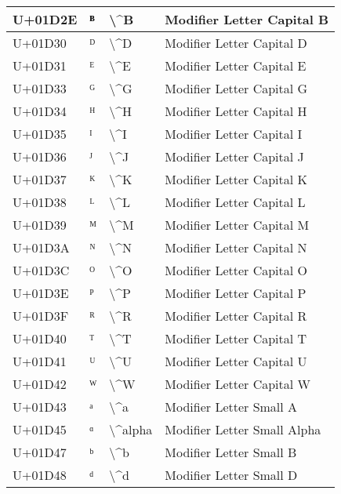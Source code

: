 \begin{table}[h]
\begin{tabulary}{\linewidth}{|L|L|L|L|}
U+01D2E & ᴮ & {\textbackslash}{\textasciicircum}B & Modifier Letter Capital B \\
\hline
U+01D30 & ᴰ & {\textbackslash}{\textasciicircum}D & Modifier Letter Capital D \\
\hline
U+01D31 & ᴱ & {\textbackslash}{\textasciicircum}E & Modifier Letter Capital E \\
\hline
U+01D33 & ᴳ & {\textbackslash}{\textasciicircum}G & Modifier Letter Capital G \\
\hline
U+01D34 & ᴴ & {\textbackslash}{\textasciicircum}H & Modifier Letter Capital H \\
\hline
U+01D35 & ᴵ & {\textbackslash}{\textasciicircum}I & Modifier Letter Capital I \\
\hline
U+01D36 & ᴶ & {\textbackslash}{\textasciicircum}J & Modifier Letter Capital J \\
\hline
U+01D37 & ᴷ & {\textbackslash}{\textasciicircum}K & Modifier Letter Capital K \\
\hline
U+01D38 & ᴸ & {\textbackslash}{\textasciicircum}L & Modifier Letter Capital L \\
\hline
U+01D39 & ᴹ & {\textbackslash}{\textasciicircum}M & Modifier Letter Capital M \\
\hline
U+01D3A & ᴺ & {\textbackslash}{\textasciicircum}N & Modifier Letter Capital N \\
\hline
U+01D3C & ᴼ & {\textbackslash}{\textasciicircum}O & Modifier Letter Capital O \\
\hline
U+01D3E & ᴾ & {\textbackslash}{\textasciicircum}P & Modifier Letter Capital P \\
\hline
U+01D3F & ᴿ & {\textbackslash}{\textasciicircum}R & Modifier Letter Capital R \\
\hline
U+01D40 & ᵀ & {\textbackslash}{\textasciicircum}T & Modifier Letter Capital T \\
\hline
U+01D41 & ᵁ & {\textbackslash}{\textasciicircum}U & Modifier Letter Capital U \\
\hline
U+01D42 & ᵂ & {\textbackslash}{\textasciicircum}W & Modifier Letter Capital W \\
\hline
U+01D43 & ᵃ & {\textbackslash}{\textasciicircum}a & Modifier Letter Small A \\
\hline
U+01D45 & ᵅ & {\textbackslash}{\textasciicircum}alpha & Modifier Letter Small Alpha \\
\hline
U+01D47 & ᵇ & {\textbackslash}{\textasciicircum}b & Modifier Letter Small B \\
\hline
U+01D48 & ᵈ & {\textbackslash}{\textasciicircum}d & Modifier Letter Small D \\

\end{tabulary}
\end{table}

